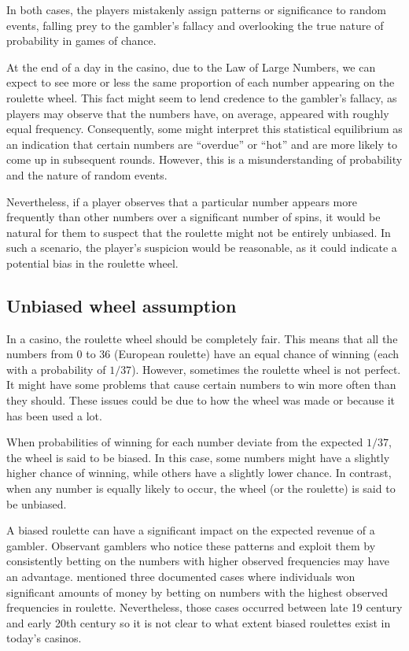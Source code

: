 \documentclass[11pt,twoside]{article}
\numberwithin{Theorem}{section}
\numberwithin{Definition}{section}
\numberwithin{Lemma}{section}
\numberwithin{Algorithm}{section}
\numberwithin{equation}{section}
\begin{document}
In both cases, the players mistakenly assign patterns or significance to random events, falling prey to the gambler's fallacy and overlooking the true nature of probability in games of chance.

At the end of a day in the casino, due to the Law of Large Numbers, we can expect to see more or less the same proportion of each number appearing on the roulette wheel. This fact might seem to lend credence to the gambler's fallacy, as players may observe that the numbers have, on average, appeared with roughly equal frequency. Consequently, some might interpret this statistical equilibrium as an indication that certain numbers are “overdue” or “hot” and are more likely to come up in subsequent rounds. However, this is a misunderstanding of probability and the nature of random events. 

Nevertheless, if a player observes that a particular number appears more frequently than other numbers over a significant number of spins, it would be natural for them to suspect that the roulette might not be entirely unbiased. In such a scenario, the player's suspicion would be reasonable, as it could indicate a potential bias in the roulette wheel.

\subsection{Unbiased wheel assumption}
In a casino, the roulette wheel should be completely fair. This means that all the numbers from 0 to 36 (European roulette) have an equal chance of winning (each with a probability of $1/37$). However, sometimes the roulette wheel is not perfect. It might have some problems that cause certain numbers to win more often than they should. These issues could be due to how the wheel was made or because it has been used a lot.

When probabilities of winning for each number deviate from the expected $1/37$, the wheel is said to be biased. In this case, some numbers might have a slightly higher chance of winning, while others have a slightly lower chance. In contrast, when any number is equally likely to occur, the wheel (or the roulette) is said to be unbiased.

A biased roulette can have a significant impact on the expected revenue of a gambler. Observant gamblers who notice these patterns and exploit them by consistently betting on the numbers with higher observed frequencies may have an advantage. \cite{Ethier_1982} mentioned three documented cases where individuals won significant amounts of money by betting on numbers with the highest observed frequencies in roulette. Nevertheless, those cases occurred between late 19 century and early 20th century so it is not clear to what extent biased roulettes exist in today's casinos. 
\end{document}
